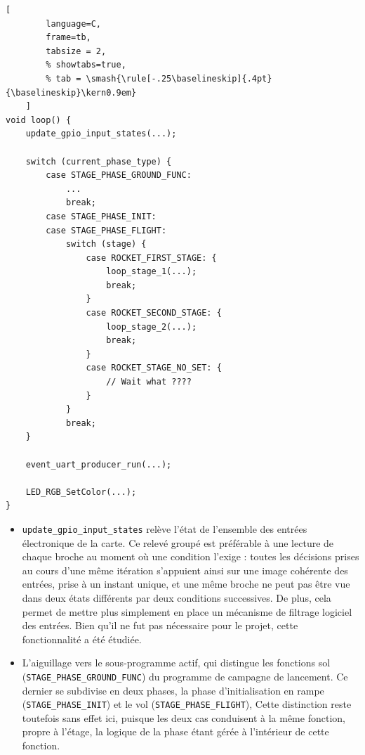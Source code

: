 \hspace*{-\parindent}%
\begin{minipage}{0.5\textwidth}
	\begin{lstlisting}[
		language=C,
		frame=tb,
		tabsize = 2,
		% showtabs=true,
		% tab = \smash{\rule[-.25\baselineskip]{.4pt}{\baselineskip}\kern0.9em}
	]
void loop() {
	update_gpio_input_states(...);

	switch (current_phase_type) {
		case STAGE_PHASE_GROUND_FUNC:
			...
			break;
		case STAGE_PHASE_INIT:
		case STAGE_PHASE_FLIGHT:
			switch (stage) {
				case ROCKET_FIRST_STAGE: {
					loop_stage_1(...);
					break;
				}
				case ROCKET_SECOND_STAGE: {
					loop_stage_2(...);
					break;
				}
				case ROCKET_STAGE_NO_SET: {
					// Wait what ????
				}
			}
			break;
	}

	event_uart_producer_run(...);

	LED_RGB_SetColor(...);
}
	\end{lstlisting}
\end{minipage}
\hfill
\begin{minipage}{0.45\textwidth}	
	\begin{itemize}
		\item \texttt{update\_gpio\_input\_states} relève l'état de l'ensemble des entrées électronique de la carte. Ce relevé
		groupé est préférable à une lecture de chaque broche au moment où une condition l'exige : toutes les décisions prises au
		cours d'une même itération s'appuient ainsi sur une image cohérente des entrées, prise à un instant unique, et une même
		broche ne peut pas être vue dans deux états différents par deux conditions successives. De plus, cela permet de mettre
		plus simplement en place un mécanisme de filtrage logiciel des entrées. Bien qu'il ne fut pas nécessaire pour le projet,
		cette fonctionnalité a été étudiée.\\

		\item L'aiguillage vers le sous-programme actif, qui distingue les fonctions sol (\texttt{STAGE\_PHASE\_GROUND\_FUNC}) du
		programme de campagne de lancement. Ce dernier se subdivise en deux phases, la phase d'initialisation en rampe
		(\texttt{STAGE\_PHASE\_INIT}) et le vol (\texttt{STAGE\_PHASE\_FLIGHT}), Cette distinction reste toutefois sans effet
		ici, puisque les deux cas conduisent à la même fonction, propre à l'étage, la logique de la phase étant gérée à
		l'intérieur de cette fonction.
	\end{itemize}
\end{minipage}

